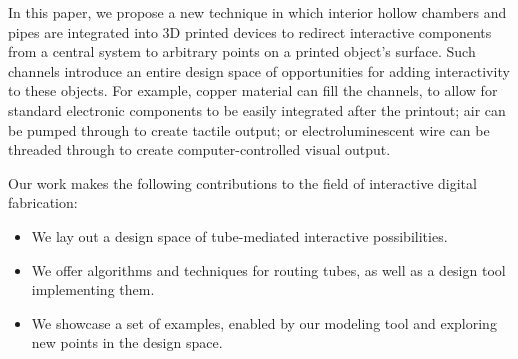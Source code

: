 In this paper, we propose a new technique in which interior hollow chambers and pipes are integrated into 3D printed devices to redirect interactive components from a central system to arbitrary points on a printed object's surface. Such channels introduce an entire design space of opportunities for adding interactivity to these objects. For example, copper material can fill the channels, to allow for standard electronic components to be easily integrated after the printout; air can be pumped through to create tactile output; or electroluminescent wire can be threaded through to create computer-controlled visual output.

Our work makes the following contributions to the field of interactive digital fabrication:

\begin{itemize}
\item We lay out a design space of tube-mediated interactive possibilities. 
\item We offer algorithms and techniques for routing tubes, as well as a design tool implementing them.
\item We showcase a set of examples, enabled by our modeling tool and exploring new points in the design space.
\end{itemize}

